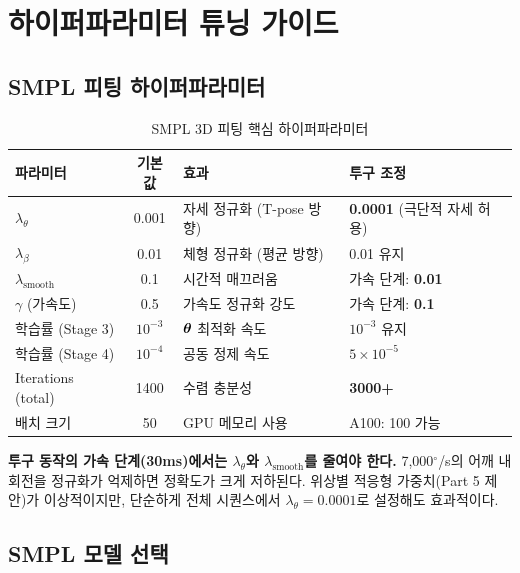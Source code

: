 \documentclass[11pt, a4paper]{report}
\begin{document}
\chapter{하이퍼파라미터 튜닝 가이드}

\section{SMPL 피팅 하이퍼파라미터}

\begin{table}[H]
\centering
\caption{SMPL 3D 피팅 핵심 하이퍼파라미터}
\renewcommand{\arraystretch}{1.3}
\begin{tabularx}{\textwidth}{lcXX}
\toprule
\textbf{파라미터} & \textbf{기본값} & \textbf{효과} & \textbf{투구 조정} \\
\midrule
$\lambda_\theta$ & 0.001 & 자세 정규화 (T-pose 방향) & \textbf{0.0001} (극단적 자세 허용) \\
$\lambda_\beta$ & 0.01 & 체형 정규화 (평균 방향) & 0.01 유지 \\
$\lambda_{\text{smooth}}$ & 0.1 & 시간적 매끄러움 & 가속 단계: \textbf{0.01} \\
$\gamma$ (가속도) & 0.5 & 가속도 정규화 강도 & 가속 단계: \textbf{0.1} \\
학습률 (Stage 3) & $10^{-3}$ & $\bm{\theta}$ 최적화 속도 & $10^{-3}$ 유지 \\
학습률 (Stage 4) & $10^{-4}$ & 공동 정제 속도 & $5 \times 10^{-5}$ \\
Iterations (total) & 1400 & 수렴 충분성 & \textbf{3000+} \\
배치 크기 & 50 & GPU 메모리 사용 & A100: 100 가능 \\
\bottomrule
\end{tabularx}
\end{table}

\begin{importantnote}
\textbf{투구 동작의 가속 단계(30ms)에서는 $\lambda_\theta$와 $\lambda_{\text{smooth}}$를 줄여야 한다.}
7,000$^\circ$/s의 어깨 내회전을 정규화가 억제하면 정확도가 크게 저하된다.
위상별 적응형 가중치(Part 5 제안)가 이상적이지만,
단순하게 전체 시퀀스에서 $\lambda_\theta = 0.0001$로 설정해도 효과적이다.
\end{importantnote}


\section{SMPL 모델 선택}
\end{document}
